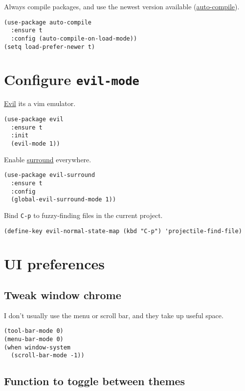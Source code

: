 \documentclass[11pt]{article}
\begin{document}
Always compile packages, and use the newest version available (\href{https://github.com/emacscollective/auto-compile}{auto-compile}).

\begin{verbatim}
(use-package auto-compile
  :ensure t
  :config (auto-compile-on-load-mode))
(setq load-prefer-newer t)
\end{verbatim}

\section{Configure \texttt{evil-mode}}
\label{sec:orga9c4b2b}

\href{https://github.com/emacs-evil/evil}{Evil} its a vim emulator.

\begin{verbatim}
(use-package evil
  :ensure t
  :init
  (evil-mode 1))
\end{verbatim}

Enable \href{https://github.com/emacs-evil/evil-surround}{surround} everywhere.

\begin{verbatim}
(use-package evil-surround
  :ensure t
  :config
  (global-evil-surround-mode 1))
\end{verbatim}

Bind \texttt{C-p} to fuzzy-finding files in the current project.

\begin{verbatim}
(define-key evil-normal-state-map (kbd "C-p") 'projectile-find-file)
\end{verbatim}

\section{UI preferences}
\label{sec:org3420e89}
\subsection{Tweak window chrome}
\label{sec:org3fae141}

I don't usually use the menu or scroll bar, and they take up useful space.

\begin{verbatim}
(tool-bar-mode 0)
(menu-bar-mode 0)
(when window-system
  (scroll-bar-mode -1))
\end{verbatim}

\subsection{Function to toggle between themes}
\label{sec:orgccc69ed}
\end{document}
